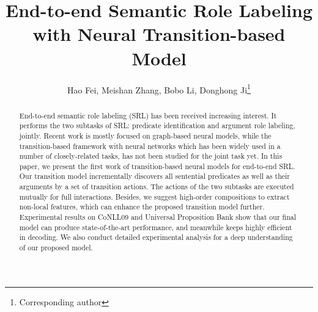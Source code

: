 \documentclass[letterpaper]{article} \usepackage{aaai21}  \usepackage{times}  \usepackage{helvet} \usepackage{courier}  \usepackage[hyphens]{url}  \usepackage{graphicx} \urlstyle{rm} \def\UrlFont{\rm}  \usepackage{natbib}  \usepackage{caption}
\begin{document}
\begin{CJK}{UTF8}{gbsn}



\title{End-to-end Semantic Role Labeling with Neural Transition-based Model}





\author{Hao Fei,\textsuperscript{\rm } Meishan Zhang,\textsuperscript{\rm } Bobo Li,\textsuperscript{\rm } Donghong Ji\textsuperscript{\rm }\thanks{Corresponding author}\\
}




\maketitle
\begin{abstract}
End-to-end semantic role labeling (SRL) has been received increasing interest.
It performs the two subtasks of SRL: predicate identification and argument role labeling, jointly.
Recent work is mostly focused on graph-based neural models,
while the transition-based framework with neural networks which has been widely used in a number of closely-related tasks,
has not been studied for the joint task yet.
In this paper, we present the first work of transition-based neural models for end-to-end SRL.
Our transition model incrementally discovers all sentential predicates as well as their arguments by a set of transition actions.
The actions of the two subtasks are executed mutually for full interactions.
Besides, we suggest high-order compositions to extract non-local features, which can enhance the proposed transition model further.
Experimental results on CoNLL09 and Universal Proposition Bank show that our final model can produce state-of-the-art performance,
and meanwhile keeps highly efficient in decoding.
We also conduct detailed experimental analysis for a deep understanding of our proposed model.
\end{abstract}















\end{CJK}
\end{document}
